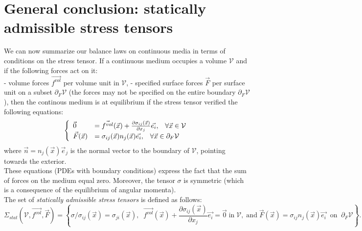 \documentclass[DIV=12]{article}
\newcommand{\vol}{\mathcal{V}}
\newcommand{\fVol}{\vec{f^{vol}}}
\begin{document}
\section{General conclusion: statically admissible stress tensors}
We can now summarize our balance laws on continuous media
  in terms of conditions on the stress tensor. If 
  a continuous medium  occupies a volume $\mathcal{V}$ and if the following 
 forces act on it:\\
-  volume forces $\fVol$ per volume unit in $\vol$,
-  specified surface forces $\vec{F}$ per surface unit on a subset $\partial_{F}\vol$ (the forces 
 may not be specified on the entire boundary $\partial_{F}\vol$),
 then the continous medium is at equilibrium if the stress tensor verified the following equations:
\[ 
 \left\{\begin{array}{l l }
\vec{0}& = \fVol(\vec{x}) + \frac{\partial \sigma_{ij}(\vec{x})}{\partial x_j} \vec{e_i},\;\;\; \forall \vec{x} \in \vol\\
\vec{F}(\vec{x}) &= \sigma_{ij} (\vec{x}) n_j(\vec{x})\vec{e_i},\;\;\;\forall \vec{x} \in \partial_{F}\vol
\end{array}
\right.
\]
where $\vec{n} = n_j( \vec{x}) \vec{e}_j$ is the normal vector to the boundary of $\vol$, pointing
 towards the exterior. \\
These equations (PDEs with boundary conditions) express the fact that the sum of forces on the 
 medium equal zero. Moreover, the tensor $\sigma$ is symmetric (which is a consequence of the 
 equilibrium of angular momenta).\\

 The set of {\emph{statically admissible stress tensors}} is defined as follows:
\begin{equation}
\boxed{\Sigma_{stat}(\vol, \fVol, \vec{F}) = \left\{   \sigma/ \sigma_{ij}(\vec{x}) =  \sigma_{ji}(\vec{x}),\;\;
\fVol(\vec{x}) + \frac{\partial \sigma_{ij}(\vec{x})}{\partial x_j} \vec{e_i} = \vec{0}\; {\mathrm{in}} \;\vol, \;{\mathrm{and}}\;
\vec{F}(\vec{x})= \sigma_{ij} n_j(\vec{x}) \vec{e_i} \;\; {\mathrm{on}}\;\; \partial_{F}\vol\right\}.}
\end{equation}
 
\end{document}
